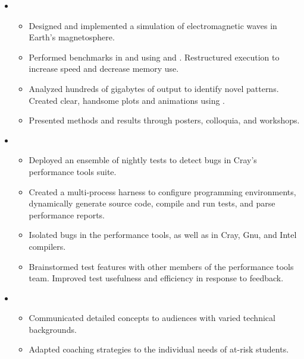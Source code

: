 
\begin{itemize}[leftmargin=\parindent]
  \parskip=0.1em
  \itemsep=1.5em

  \item[]
    \\
    \begin{itemize}
      \item Designed and implemented a simulation of electromagnetic waves in Earth's magnetosphere. 
      \item Performed benchmarks in \CPP and \Fortran using \MPI and \OpenMP. Restructured execution to increase speed and decrease memory use. 
      \item Analyzed hundreds of gigabytes of output to identify novel patterns. Created clear, handsome plots and animations using \matplotlib. 
      \item Presented methods and results through posters, colloquia, and workshops. 
    \end{itemize}

  \item[]
    \\
    \begin{itemize}
      \item Deployed an ensemble of nightly tests to detect bugs in Cray's performance tools suite. 
      \item Created a multi-process \Python harness to configure programming environments, dynamically generate source code, compile and run tests, and parse performance reports. 
      \item Isolated bugs in the performance tools, as well as in Cray, Gnu, and Intel compilers. 
      \item Brainstormed test features with other members of the performance tools team. Improved test usefulness and efficiency in response to feedback. 
    \end{itemize}

  \item[]
    \\
    \begin{itemize}
      \item Communicated detailed concepts to audiences with varied technical backgrounds. 
      \item Adapted coaching strategies to the individual needs of at-risk students. 


\end{itemize}
\end{itemize}
